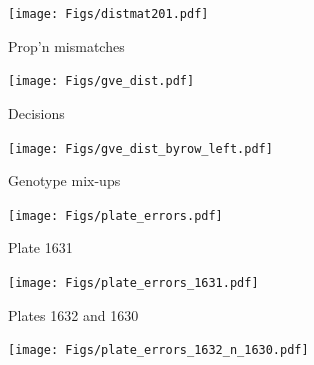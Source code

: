 \documentclass[12pt]{article}
\newcommand{\headsize}{\fontsize{35}{35} \selectfont}
\begin{document}
\vfill

\centerline{\texttt{[image: Figs/distmat201.pdf]}}

\newpage




%
%
%




\headsize \color{myyellow}
\hfill \begin{minipage}{5.75in}
\centering
Prop'n mismatches
\end{minipage}

\vfill

\centerline{\texttt{[image: Figs/gve\_dist.pdf]}}

\newpage


\headsize \color{myyellow}
\hfill \begin{minipage}{5.75in}
\centering
Decisions
\end{minipage}

\vfill

\centerline{\texttt{[image: Figs/gve\_dist\_byrow\_left.pdf]}}

\newpage


\headsize \color{myyellow}
\hfill \begin{minipage}{5.75in}
\centering
Genotype mix-ups
\end{minipage}

\vfill

\centerline{\texttt{[image: Figs/plate\_errors.pdf]}}

\newpage


\headsize \color{myyellow}
\hfill \begin{minipage}{5.75in}
\centering
Plate 1631
\end{minipage}

\vfill

\centerline{\texttt{[image: Figs/plate\_errors\_1631.pdf]}}

\newpage


\headsize \color{myyellow}
\hfill \begin{minipage}{5.75in}
\centering
Plates 1632 and 1630
\end{minipage}

\vfill

\centerline{\texttt{[image: Figs/plate\_errors\_1632\_n\_1630.pdf]}}
\end{document}
